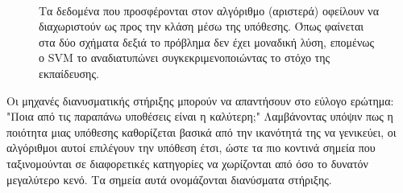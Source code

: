 \begin{figure}[!htb]
\begin{minipage}[b]{0.45\textwidth}
\begin{subfigure}[b]{\linewidth}
{\begin{tikzpicture}
    	\end{tikzpicture}
    	}
   		\end{subfigure}\\[\baselineskip]
   		\begin{subfigure}[b]{\linewidth}
   			 \resizebox{0.5\textwidth}{1.5cm} {
   			 	\centering
}
   		\end{subfigure}
   	\end{minipage}
   	\caption[Χώρος ταξινόμησης SVM]{Τα δεδομένα που προσφέρονται στον αλγόριθμο (αριστερά) οφείλουν να διαχωριστούν ως προς την κλάση μέσω της υπόθεσης. Όπως φαίνεται στα δύο σχήματα δεξιά το πρόβλημα δεν έχει μοναδική λύση, επομένως ο \gls{SVM} το αναδιατυπώνει συγκεκριμενοποιώντας το στόχο της εκπαίδευσης.}\label{fig:svm}
   \end{figure}
   
Οι μηχανές διανυσματικής στήριξης μπορούν να απαντήσουν στο εύλογο ερώτημα: "Ποια από τις παραπάνω υποθέσεις είναι η καλύτερη;" Λαμβάνοντας υπόψιν πως η ποιότητα μιας υπόθεσης καθορίζεται βασικά από την ικανότητά της να γενικεύει, οι αλγόριθμοι αυτοί επιλέγουν την υπόθεση έτσι, ώστε τα πιο κοντινά σημεία που ταξινομούνται σε διαφορετικές κατηγορίες να χωρίζονται από όσο το δυνατόν
μεγαλύτερο κενό. Τα σημεία αυτά ονομάζονται διανύσματα στήριξης.


